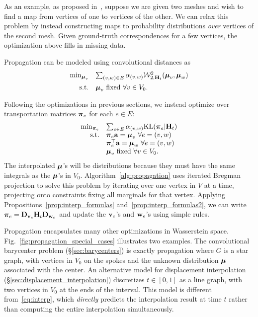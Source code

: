 As an example, as proposed in~\cite{solomon-2012}, suppose we are given two meshes and wish to find a map from vertices of one to vertices of the other.  We can relax this problem by instead constructing maps to probability distributions \emph{over} vertices of the second mesh.  Given ground-truth correspondences for a few vertices, the optimization above fills in missing data.

Propagation can be modeled using convolutional distances as
\begin{equation}\label{eq:propagation}
\begin{array}{rl}
	\min_{\boldsymbol{\mu}_v} &\sum_{(v,w)\in E} \alpha_{(v,w)} \mathcal W^2_{2,\mathbf{H}_t}(\boldsymbol{\mu}_v,\boldsymbol{\mu}_w)
    \\[2mm]
\textrm{s.t.} & \boldsymbol{\mu}_v\textrm{ fixed }\forall v\in V_0.
\end{array}
\end{equation}

Following the optimizations in previous sections, we instead optimize over transportation matrices $\boldsymbol{\pi}_e$ for each $e\in E$:
$$
\begin{array}{rl}
\min_{\boldsymbol{\pi}_e} & \sum_{e\in E} \alpha_{(v,w)}\mathrm{KL}(\boldsymbol{\pi}_e|\mathbf{H}_t)\\
\textrm{s.t.} & \boldsymbol{\pi}_e \mathbf a = \boldsymbol{\mu}_v\ \forall e=(v,w)\\
& \boldsymbol{\pi}_e^\top\mathbf a = \boldsymbol{\mu}_w\ \forall e=(v,w)\\
& \boldsymbol{\mu}_v\textrm{ fixed }\forall v\in V_0.
\end{array}
$$
The interpolated $\boldsymbol{\mu}$'s will be distributions because they must have the same integrals as the $\boldsymbol{\mu}$'s in $V_0$.  Algorithm~\ref{alg:propagation} uses iterated Bregman projection to solve this problem by iterating over one vertex in $V$ at a time, projecting onto constraints fixing all marginals for that vertex.  Applying Propositions~\ref{prop:interp_formulas} and~\ref{prop:interp_formulas2}, we can write $\boldsymbol{\pi}_e=\mathbf{D}_{\mathbf v_e} \mathbf{H}_t\mathbf{D}_{\mathbf w_e}$ and update the $\mathbf v_e$'s and $\mathbf w_e$'s using simple rules.

Propagation encapsulates many other optimizations in Wasserstein space.  Fig.~\ref{fig:propagation_special_cases} illustrates two examples.  The convolutional barycenter problem (\S\ref{sec:barycenters}) is exactly propagation where $G$ is a star graph, with vertices in $V_0$ on the spokes and the unknown distribution $\boldsymbol{\mu}$ associated with the center.  An alternative model for displacement interpolation (\S\ref{sec:displacement_interpolation}) discretizes $t\in[0,1]$ as a line graph, with two vertices in $V_0$ at the ends of the interval.  This model is different from~\eqref{eq:interp}, which \emph{directly} predicts the interpolation result at time $t$ rather than computing the entire interpolation simultaneously.

